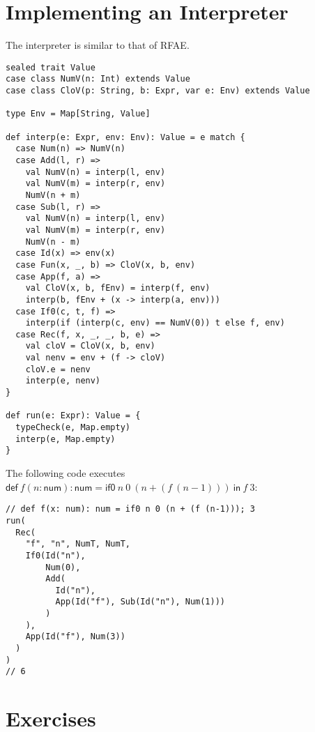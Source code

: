 \section{Implementing an Interpreter}

The interpreter is similar to that of RFAE.

\begin{verbatim}
sealed trait Value
case class NumV(n: Int) extends Value
case class CloV(p: String, b: Expr, var e: Env) extends Value

type Env = Map[String, Value]

def interp(e: Expr, env: Env): Value = e match {
  case Num(n) => NumV(n)
  case Add(l, r) =>
    val NumV(n) = interp(l, env)
    val NumV(m) = interp(r, env)
    NumV(n + m)
  case Sub(l, r) =>
    val NumV(n) = interp(l, env)
    val NumV(m) = interp(r, env)
    NumV(n - m)
  case Id(x) => env(x)
  case Fun(x, _, b) => CloV(x, b, env)
  case App(f, a) =>
    val CloV(x, b, fEnv) = interp(f, env)
    interp(b, fEnv + (x -> interp(a, env)))
  case If0(c, t, f) =>
    interp(if (interp(c, env) == NumV(0)) t else f, env)
  case Rec(f, x, _, _, b, e) =>
    val cloV = CloV(x, b, env)
    val nenv = env + (f -> cloV)
    cloV.e = nenv
    interp(e, nenv)
}

def run(e: Expr): Value = {
  typeCheck(e, Map.empty)
  interp(e, Map.empty)
}
\end{verbatim}

The following code executes $\textsf{def}\ f(n:\textsf{num}):\textsf{num}=\textsf{if0}\ n\ 0\
(n+(f\ (n-1)))\ \textsf{in}\ f\ 3$:

\begin{verbatim}
// def f(x: num): num = if0 n 0 (n + (f (n-1))); 3
run(
  Rec(
    "f", "n", NumT, NumT,
    If0(Id("n"),
        Num(0),
        Add(
          Id("n"),
          App(Id("f"), Sub(Id("n"), Num(1)))
        )
    ),
    App(Id("f"), Num(3))
  )
)
// 6
\end{verbatim}

\section{Exercises}


